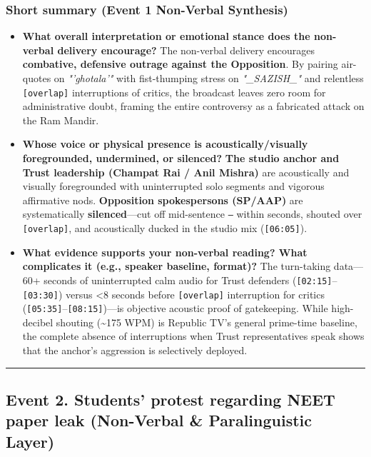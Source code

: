 \documentclass[10pt,a4paper]{article}
\begin{document}
\subsubsection*{Short summary (Event 1 Non-Verbal Synthesis)}

\begin{itemize}
  \item \textbf{What overall interpretation or emotional stance does the non-verbal delivery encourage?}
The non-verbal delivery encourages \textbf{combative, defensive outrage against the Opposition}. By pairing air-quotes on \textit{"'ghotala'"} with fist-thumping stress on \textit{"\_SAZISH\_"} and relentless \texttt{[overlap]} interruptions of critics, the broadcast leaves zero room for administrative doubt, framing the entire controversy as a fabricated attack on the Ram Mandir.\par\smallskip
  \item \textbf{Whose voice or physical presence is acoustically/visually foregrounded, undermined, or silenced?}
\textbf{The studio anchor and Trust leadership (Champat Rai / Anil Mishra)} are acoustically and visually foregrounded with uninterrupted solo segments and vigorous affirmative nods. \textbf{Opposition spokespersons (SP/AAP)} are systematically \textbf{silenced}---cut off mid-sentence \texttt{---} within seconds, shouted over \texttt{[overlap]}, and acoustically ducked in the studio mix (\texttt{[06:05]}).\par\smallskip
  \item \textbf{What evidence supports your non-verbal reading? What complicates it (e.g., speaker baseline, format)?}
The turn-taking data---60+ seconds of uninterrupted calm audio for Trust defenders (\texttt{[02:15]}--\texttt{[03:30]}) versus <8 seconds before \texttt{[overlap]} interruption for critics (\texttt{[05:35]}--\texttt{[08:15]})---is objective acoustic proof of gatekeeping. While high-decibel shouting (\textasciitilde{}175 WPM) is Republic TV's general prime-time baseline, the complete absence of interruptions when Trust representatives speak shows that the anchor's aggression is selectively deployed.\par\smallskip
\end{itemize}

\bigskip\hrule\bigskip

\subsection*{Event 2. Students' protest regarding NEET paper leak (Non-Verbal \& Paralinguistic Layer)}
\end{document}
